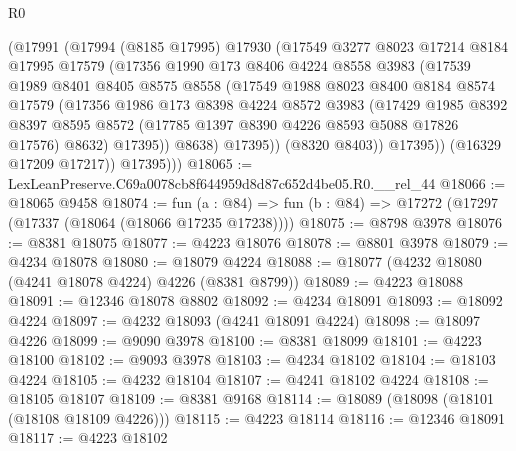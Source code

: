 \begin{lexlean}{R0}
\begin{coremodule}
              (@17991
                (@17994
                  (@8185 @17995)
                  @17930
                  (@17549
                    @3277
                    @8023
                    @17214
                    @8184
                    @17995
                    @17579
                    (@17356
                      @1990
                      @173
                      @8406
                      @4224
                      @8558
                      @3983
                      (@17539
                        @1989
                        @8401
                        @8405
                        @8575
                        @8558
                        (@17549
                          @1988
                          @8023
                          @8400
                          @8184
                          @8574
                          @17579
                          (@17356
                            @1986
                            @173
                            @8398
                            @4224
                            @8572
                            @3983
                            (@17429
                              @1985
                              @8392
                              @8397
                              @8595
                              @8572
                              (@17785 @1397 @8390 @4226 @8593 @5088 @17826 @17576)
                              @8632)
                            @17395))
                        @8638)
                      @17395))
                  (@8320 @8403))
                @17395))
            (@16329 @17209 @17217))
          @17395)))
@18065 := LexLeanPreserve.C69a0078cb8f644959d8d87c652d4be05.R0.__rel_44
@18066 := @18065 @9458
@18074 := fun (a : @84) => fun (b : @84) => @17272 (@17297 (@17337 (@18064 (@18066 @17235 @17238))))
@18075 := @8798 @3978
@18076 := @8381 @18075
@18077 := @4223 @18076
@18078 := @8801 @3978
@18079 := @4234 @18078
@18080 := @18079 @4224
@18088 := @18077 (@4232 @18080 (@4241 @18078 @4224) @4226 (@8381 @8799))
@18089 := @4223 @18088
@18091 := @12346 @18078 @8802
@18092 := @4234 @18091
@18093 := @18092 @4224
@18097 := @4232 @18093 (@4241 @18091 @4224)
@18098 := @18097 @4226
@18099 := @9090 @3978
@18100 := @8381 @18099
@18101 := @4223 @18100
@18102 := @9093 @3978
@18103 := @4234 @18102
@18104 := @18103 @4224
@18105 := @4232 @18104
@18107 := @4241 @18102 @4224
@18108 := @18105 @18107
@18109 := @8381 @9168
@18114 := @18089 (@18098 (@18101 (@18108 @18109 @4226)))
@18115 := @4223 @18114
@18116 := @12346 @18091
@18117 := @4223 @18102

\end{coremodule}
\end{lexlean}
